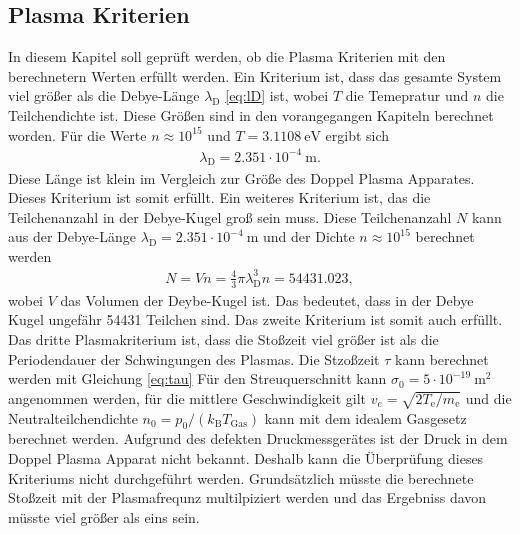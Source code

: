 \subsection{Plasma Kriterien}
In diesem Kapitel soll geprüft werden, ob die Plasma Kriterien mit den berechnetern Werten erfüllt werden. Ein Kriterium ist, dass das gesamte System viel größer als die Debye-Länge $\lambda_{\mathrm{D}}$ \eqref{eq:lD}
ist, wobei $T$ die Temepratur und $n$ die Teilchendichte ist. Diese Größen sind in den vorangegangen Kapiteln berechnet worden. Für die Werte $n \approx 10^{15} $ und $T=3.1108\ \mathrm{eV} $ ergibt sich
\begin{align}
\lambda_{\mathrm{D}} = 2.351 \cdot 10^{-4}\ \mathrm{m}.
\end{align}
Diese Länge ist klein im Vergleich zur Größe des Doppel Plasma Apparates. Dieses Kriterium ist somit erfüllt.  Ein weiteres Kriterium ist, das die Teilchenanzahl in der Debye-Kugel groß sein muss. Diese Teilchenanzahl  $N$ kann aus der Debye-Länge $\lambda_{\mathrm{D}}= 2.351 \cdot 10^{-4}\ \mathrm{m}$ und der Dichte $n \approx 10^{15}$ berechnet werden
\begin{align}
N = V n= \frac{4}{3}\pi \lambda_{\mathrm{D}}^3 n = 54431.023 ,
\end{align}
wobei $V$ das Volumen der Deybe-Kugel ist. Das bedeutet, dass in der Debye Kugel ungefähr 54431 Teilchen sind. Das zweite Kriterium ist somit auch erfüllt. Das dritte Plasmakriterium ist, dass die Stoßzeit viel größer ist als die Periodendauer der Schwingungen des Plasmas. Die Stzoßzeit $\tau$ kann berechnet werden mit
Gleichung \eqref{eq:tau}
Für den Streuquerschnitt kann $\sigma_0= 5 \cdot 10^{-19}\ \mathrm{m}^2 $ angenommen werden, für die mittlere Geschwindigkeit gilt $v_e= \sqrt{2 T_{\mathrm{e}}/m_{\mathrm{e}}} $ und die Neutralteilchendichte $n_0=p_0/(k_{\mathrm{B}}T_{\mathrm{Gas}})$ kann mit dem idealem Gasgesetz berechnet werden. Aufgrund des defekten Druckmessgerätes ist der Druck in dem Doppel Plasma Apparat nicht bekannt. Deshalb kann die Überprüfung dieses Kriteriums nicht durchgeführt werden. Grundsätzlich müsste die berechnete Stoßzeit mit der Plasmafrequnz multilpiziert werden und das Ergebniss davon müsste viel größer als eins sein. 

